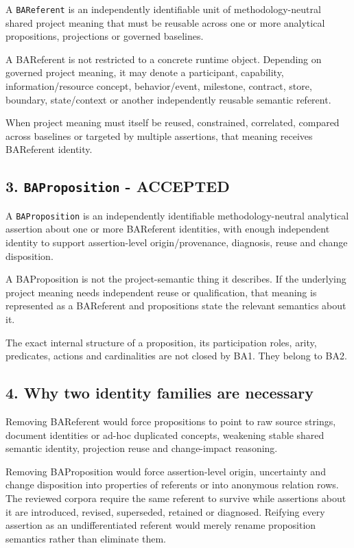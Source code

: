 \documentclass[
  10pt,
  a4paper,
]{article}
\begin{document}
A \texttt{BAReferent} is an independently identifiable unit of
methodology-neutral shared project meaning that must be reusable across
one or more analytical propositions, projections or governed baselines.

A BAReferent is not restricted to a concrete runtime object. Depending
on governed project meaning, it may denote a participant, capability,
information/resource concept, behavior/event, milestone, contract,
store, boundary, state/context or another independently reusable
semantic referent.

When project meaning must itself be reused, constrained, correlated,
compared across baselines or targeted by multiple assertions, that
meaning receives BAReferent identity.

\subsection{\texorpdfstring{3. \texttt{BAProposition} -
ACCEPTED}{3. BAProposition - ACCEPTED}}\label{baproposition---accepted}

A \texttt{BAProposition} is an independently identifiable
methodology-neutral analytical assertion about one or more BAReferent
identities, with enough independent identity to support assertion-level
origin/provenance, diagnosis, reuse and change disposition.

A BAProposition is not the project-semantic thing it describes. If the
underlying project meaning needs independent reuse or qualification,
that meaning is represented as a BAReferent and propositions state the
relevant semantics about it.

The exact internal structure of a proposition, its participation roles,
arity, predicates, actions and cardinalities are not closed by BA1. They
belong to BA2.

\subsection{4. Why two identity families are
necessary}\label{why-two-identity-families-are-necessary}

Removing BAReferent would force propositions to point to raw source
strings, document identities or ad-hoc duplicated concepts, weakening
stable shared semantic identity, projection reuse and change-impact
reasoning.

Removing BAProposition would force assertion-level origin, uncertainty
and change disposition into properties of referents or into anonymous
relation rows. The reviewed corpora require the same referent to survive
while assertions about it are introduced, revised, superseded, retained
or diagnosed. Reifying every assertion as an undifferentiated referent
would merely rename proposition semantics rather than eliminate them.
\end{document}
